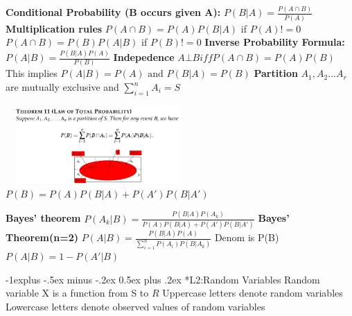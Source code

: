 \documentclass[10pt, landscape]{article}
\makeatletter
\renewcommand{\subsection}{\@startsection{subsection}{2}{0mm}%
                                {-1explus -.5ex minus -.2ex}%
                                {0.5ex plus .2ex}%
                                {\normalfont\normalsize\bfseries}}
\makeatother
\begin{document}
\begin{multicols}{4}
\textbf{Conditional Probability (B occurs given A):} $P(B|A)=\frac{P(A\cap B)}{P(A)}$ \newline
\textbf{Multiplication rules} \newline
 $P(A\cap B)=P(A)P(B|A)$ if $P(A)!=0$ \newline
$P(A\cap B)=P(B)P(A|B)$ if $P(B)!=0$ \newline
\textbf{Inverse Probability Formula:} $P(A|B)=\frac{P(B|A)P(A)}{P(B)}$ \newline
\textbf{Indepedence} $A\bot B iff P(A \cap B)=P(A)P(B)$ This implies $P(A|B)=P(A) \text{ and } P(B|A)=P(B)$ \newline
\textbf{Partition} $A_1,A_2...A_r$ are mutually exclusive and $\sum_{i=1}^{n}A_i=S$ \newline

\includegraphics[width=7cm, height=3cm]{lotp.png}
$P(B)=P(A)P(B|A)+P(A')P(B|A')$ \newline

\textbf{Bayes' theorem} $P(A_k|B)=\frac{P(B|A)P(A_k)}{P(A)P(B|A)+P(A')P(B|A')}$ \newline
\textbf{Bayes' Theorem(n=2)} $P(A|B)=\frac{P(B|A)P(A)}{\sum_{i=1}^{n}P(A_i)P(B|A_k)}$ Denom is P(B) \newline
\textbf{$P(A|B)=1-P(A'|B)$} \newline


\subsection*{L2:Random Variables}
Random variable X is a function from S to $R$ \newline
Uppercase letters denote random variables \newline
Lowercase letters denote observed values of random variables \newline


\end{multicols}
\end{document}
